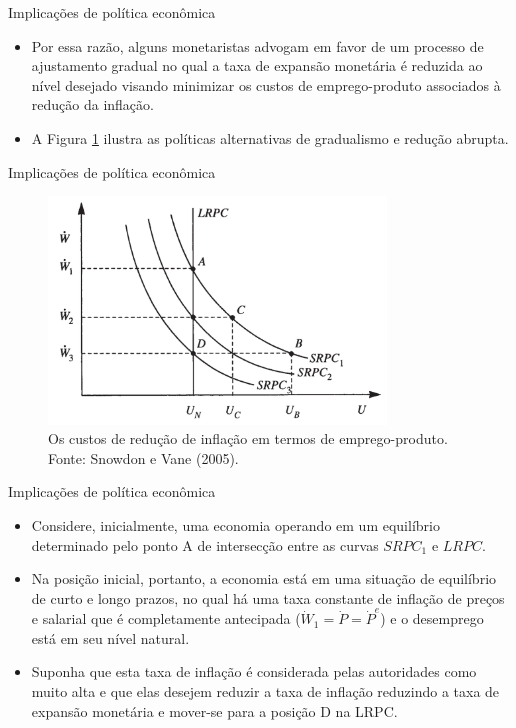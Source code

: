 \documentclass[10pt]{beamer}
\begin{document}
\begin{frame}{Implicações de política econômica}
    \begin{itemize}
        \item Por essa razão, alguns monetaristas advogam em favor de um processo de ajustamento gradual no qual a taxa de expansão monetária é reduzida ao nível desejado visando minimizar os custos de emprego-produto associados à redução da inflação.
        \bigskip
        \item A Figura \ref{fig13} ilustra as políticas alternativas de gradualismo e redução abrupta.
    \end{itemize}    
\end{frame}

\begin{frame}{Implicações de política econômica}
    \begin{figure}
        \centering
        \includegraphics[width=0.8\textwidth]{./figures/aula10_fig13.PNG}
        \caption{Os custos de redução de inflação em termos de emprego-produto. Fonte: Snowdon e Vane (2005).}
        \label{fig13}
    \end{figure}
\end{frame}

\begin{frame}{Implicações de política econômica}
    \begin{itemize}
        \item Considere, inicialmente, uma economia operando em um equilíbrio determinado pelo ponto A de intersecção entre as curvas $SRPC_1$ e $LRPC$.
        \bigskip
        \item Na posição inicial, portanto, a economia está em uma situação de equilíbrio de curto e longo prazos, no qual há uma taxa constante de inflação de preços e salarial que é completamente antecipada ($\dot{W}_1 = \dot{P} = \dot{P}^e$) e o desemprego está em seu nível natural.
        \bigskip
        \item Suponha que esta taxa de inflação é considerada pelas autoridades como muito alta e que elas desejem reduzir a taxa de inflação reduzindo a taxa de expansão monetária e mover-se para a posição D na LRPC.
    \end{itemize}    
\end{frame}
\end{document}
